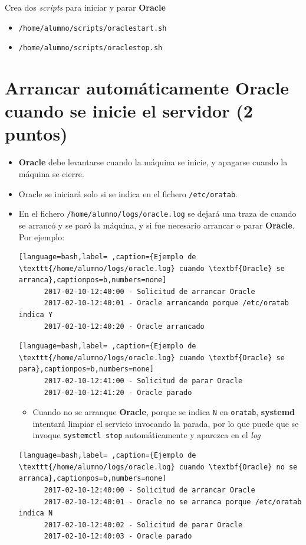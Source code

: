 \documentclass[a4paper]{article}
\begin{document}
Crea dos \emph{scripts} para iniciar y parar \textbf{Oracle}
\begin{itemize}
\item \texttt{/home/alumno/scripts/oraclestart.sh}
\item \texttt{/home/alumno/scripts/oraclestop.sh}
\end{itemize}


\section{Arrancar automáticamente \textbf{Oracle} cuando se inicie el servidor (2 puntos)}
\label{sec:org0000003}


\begin{itemize}
\item \textbf{Oracle} debe levantarse cuando la máquina se inicie, y apagarse cuando la máquina se cierre.
\item Oracle se iniciará solo si se indica en el fichero \texttt{/etc/oratab}.

\item En el fichero \texttt{/home/alumno/logs/oracle.log} se dejará una traza de cuando se arrancó y se paró la máquina, y si fue necesario arrancar o parar \textbf{Oracle}. Por ejemplo:

\begin{lstlisting}[language=bash,label= ,caption={Ejemplo de \texttt{/home/alumno/logs/oracle.log} cuando \textbf{Oracle} se arranca},captionpos=b,numbers=none]
      2017-02-10-12:40:00 - Solicitud de arrancar Oracle
      2017-02-10-12:40:01 - Oracle arrancando porque /etc/oratab indica Y
      2017-02-10-12:40:20 - Oracle arrancado
\end{lstlisting}

\begin{lstlisting}[language=bash,label= ,caption={Ejemplo de \texttt{/home/alumno/logs/oracle.log} cuando \textbf{Oracle} se para},captionpos=b,numbers=none]
      2017-02-10-12:41:00 - Solicitud de parar Oracle
      2017-02-10-12:41:20 - Oracle parado
\end{lstlisting}

\begin{itemize}
\item Cuando no se arranque \textbf{Oracle}, porque se indica \texttt{N} en \texttt{oratab}, \textbf{systemd} intentará limpiar el servicio invocando la parada, por lo que puede que se invoque \texttt{systemctl stop} automáticamente y aparezca en el \emph{log}
\end{itemize}

\begin{lstlisting}[language=bash,label= ,caption={Ejemplo de \texttt{/home/alumno/logs/oracle.log} cuando \textbf{Oracle} no se arranca},captionpos=b,numbers=none]
      2017-02-10-12:40:00 - Solicitud de arrancar Oracle
      2017-02-10-12:40:01 - Oracle no se arranca porque /etc/oratab indica N
      2017-02-10-12:40:02 - Solicitud de parar Oracle
      2017-02-10-12:40:03 - Oracle parado
\end{lstlisting}
\end{itemize}
\end{document}
